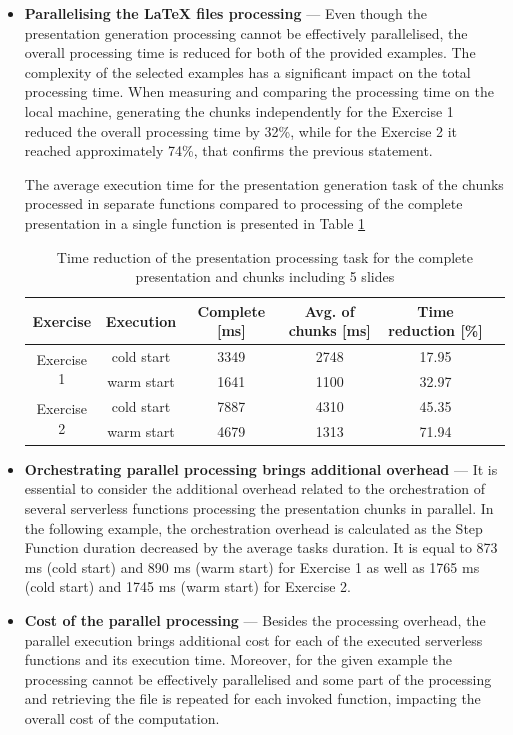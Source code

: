 \begin{itemize}
    \item \textbf{Parallelising the LaTeX files processing} --- Even though the presentation generation processing cannot be effectively parallelised, the overall processing time is reduced for both of the provided examples.
    The complexity of the selected examples has a significant impact on the total processing time.
    When measuring and comparing the processing time on the local machine, generating the chunks independently for the Exercise 1 reduced the overall processing time by 32\%, while for the Exercise 2 it reached approximately 74\%, that confirms the previous statement.
  
    The average execution time for the presentation generation task of the chunks processed in separate functions compared to processing of the complete presentation in a single function is presented in Table \ref{table:overhead-of-the-presentation-processing-task-for-the-whole-presentation-and-chunks-including-5-slides}

    \begin{table}[h]
        \centering
        \begin{tabular}{ |c|c|c|c|c|c| } 
        \hline
        Exercise & Execution & Complete [ms] & Avg. of chunks [ms] & Time reduction [\%] \\
        \hline
        \multirow{2}{*}{Exercise 1} & cold start & 3349 & 2748 & 17.95 \\
        & warm start & 1641 & 1100 & 32.97 \\
        \hline
        \multirow{2}{*}{Exercise 2} & cold start & 7887 & 4310 & 45.35 \\
        & warm start & 4679 & 1313 & 71.94 \\
        \hline
        \end{tabular}
        \caption{Time reduction of the presentation processing task for the complete presentation and chunks including 5 slides}
        \label{table:overhead-of-the-presentation-processing-task-for-the-whole-presentation-and-chunks-including-5-slides}
    \end{table}

   \item \textbf{Orchestrating parallel processing brings additional overhead} --- It is essential to consider the additional overhead related to the orchestration of several serverless functions processing the presentation chunks in parallel. In the following example, the orchestration overhead is calculated as the Step Function duration decreased by the average tasks duration. It is equal to 873 ms (cold start) and 890 ms (warm start) for Exercise 1 as well as 1765 ms (cold start) and 1745 ms (warm start) for Exercise 2.
   \item \textbf{Cost of the parallel processing} --- Besides the processing overhead, the parallel execution brings additional cost for each of the executed serverless functions and its execution time. Moreover, for the given example the processing cannot be effectively parallelised and some part of the processing and retrieving the file is repeated for each invoked function, impacting the overall cost of the computation.
\end{itemize}

